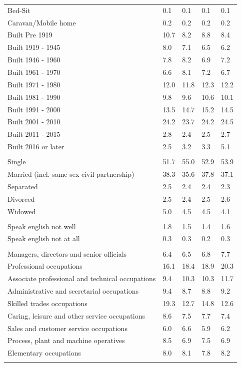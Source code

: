 \documentclass{article}
\begin{document}
\begin{table}[h]
\begin{tabular}{KTTTT}
Bed-Sit & 0.1& 0.1& 0.1& 0.1\\
Caravan/Mobile home & 0.2& 0.2& 0.2& 0.2\\
    \hline
Built Pre 1919 & 10.7&  8.2&  8.8&  8.4\\
Built 1919 - 1945 & 8.0& 7.1& 6.5& 6.2\\
Built  1946 - 1960 & 7.8& 8.2& 6.9& 7.2\\
Built  1961 - 1970 & 6.6& 8.1& 7.2& 6.7\\
Built  1971 - 1980 & 12.0& 11.8& 12.3& 12.2\\
Built  1981 - 1990 &  9.8&  9.6& 10.6& 10.1\\
Built  1991 - 2000 & 13.5& 14.7& 15.2& 14.5\\
Built  2001 - 2010 & 24.2& 23.7& 24.2& 24.5\\
Built  2011 - 2015 & 2.8& 2.4& 2.5& 2.7\\
Built  2016 or later & 2.5& 3.2& 3.3& 5.1\\
\hline
    \\
    \hline
Single & 51.7& 55.0& 52.9& 53.9\\
Married (incl. same sex civil partnership) & 38.3& 35.6& 37.8& 37.1\\
Separated  & 2.5& 2.4& 2.4& 2.3\\
Divorced  & 2.5& 2.4& 2.5& 2.6\\
Widowed & 5.0& 4.5& 4.5& 4.1\\
\hline
    \\ 
    \hline
Speak english not well & 1.8& 1.5& 1.4& 1.6\\
Speak english not at all & 0.3& 0.3& 0.2& 0.3\\
\hline
    \\
    \hline
Managers, directors and senior officials & 6.4& 6.5& 6.8& 7.7\\
Professional occupations & 16.1& 18.4& 18.9& 20.3\\
Associate professional and technical occupations &  9.4& 10.3& 10.3& 11.7\\
Administrative and secretarial occupations & 9.4& 8.7& 8.8& 9.2\\
Skilled trades occupations & 19.3& 12.7& 14.8& 12.6\\
Caring, leisure and other service occupations & 8.6& 7.5& 7.7& 7.4\\
Sales and customer service occupations & 6.0& 6.6& 5.9& 6.2\\
Process, plant and machine operatives & 8.5& 6.9& 7.5& 6.9\\
Elementary occupations & 8.0& 8.1& 7.8& 8.2\\
\hline
\end{tabular}
\end{table}
\end{document}
